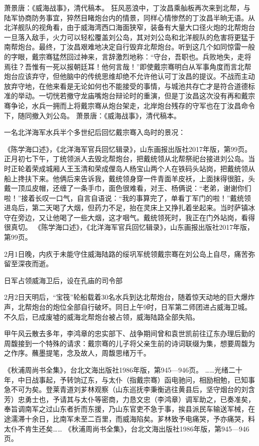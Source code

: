 \documentclass[12pt,UTF8]{ctexbook}
\begin{document}
萧景唐：《威海战事》，清代稿本。
狂风恶浪中，丁汝昌乘舢板再次来到北帮，与陆军协商防务事宜，猝然目睹炮台内的情景，同样心情惨然的丁汝昌半晌无语。从北洋舰队的视角看，由于威海湾西口海面狭窄，装备有大量大口径火炮的北帮炮台一旦落入敌手，火力可以轻松覆盖刘公岛，其对刘公岛和北洋舰队的危害将更猛于南帮炮台。最终，丁汝昌艰难地决定自行毁弃北帮炮台。听到这几个如同惊雷一般的字眼，戴宗骞猛然回过神来，言辞激烈地称：“守台，吾职也。兵败地失，走将焉往？吾惟有一死以报朝廷耳！他何言哉！”即使戴宗骞明白从军事角度而言北帮炮台应该弃守，但他脑中的传统思维却绝不允许他认可丁汝昌的提议。不战而主动放弃守地，在他来看是无论如何也不能接受的事情，与城池共存亡才是符合道德标准的举动。一切恍若撤守龙庙嘴炮台辩论时的重演，但是丁汝昌这次没有再和戴宗骞争论，水兵一拥而上将戴宗骞从炮台架走，北岸炮台残存的守军也在丁汝昌命令下，随同撤入刘公岛。 萧景唐：《威海战事》，清代稿本。

一名北洋海军水兵半个多世纪后回忆戴宗骞入岛时的景况：

《陈学海口述》，《北洋海军官兵回忆辑录》，山东画报出版社2017年版，第99页。
正月初七下午，丁统领派人去毁北帮炮台，把戴统领从北帮祭祀台接进刘公岛。当时正轮着荣成城厢人王玉清和荣成俚岛人杨宝山两个人在铁码头站岗，把戴统领从船上搀扶下来。他俩后来告诉我，戴统领身穿一件青面羊皮袄，上面抹得很脏，头戴一顶瓜皮帽，还缠了一条手巾，面色很难看，对王、杨俩说：“老弟，谢谢你们啦！”接着长叹一口气，自言自语说：“我的事算完了，单看丁军门的啦！”戴统领进岛后，第二天喝了大烟，但药力不足，抬在灵床上又挣扎着坐起来。当时萨镇冰守在旁边，又让他喝了一些大烟，这才咽气。戴统领死时，我正在门外站岗，看得很真切。 《陈学海口述》，《北洋海军官兵回忆辑录》，山东画报出版社2017年版，第99页。

2月1日晚，内疚于未能守住威海陆路的绥巩军统领戴宗骞在刘公岛上自尽，痛苦弥留至深夜而逝。


日军占领威海卫后，设在孔庙的司令部

2月2日天明后，“宝筏”轮船载着30名水兵到达北帮炮台，随着惊天动地的巨大爆炸声，北帮炮台的炮位全部自行破坏。同日上午9时，日军第二师团进占威海卫城。不久后，已成废墟的威海北帮炮台被占领，威海陆路全部失陷。

甲午风云散去多年，李鸿章的忠实部下、战争期间曾和袁世凯前往辽东办理后勤的周馥接到一个特殊的请求：戴宗骞的儿子将父亲生前的诗词联缀为集，想要周馥为之作序。蘸墨提笔，念及故人，周馥思绪万千。

《秋浦周尚书全集》，台北文海出版社1986年版，第945—946页。
……光绪二十年，中日战事起，予转饷辽东，与太仆（指戴宗骞）函电驰问，相励相勉，已知事急不可为矣。登莱青道刘芗林观察（山东巡抚李秉衡逃往黄县后，坚守烟台的刘含芳）忠勇士也，予请其与太仆等密商，力恳文忠（李鸿章）调军助之，已奏准矣，奉旨调南军之过山东者折而东援，乃山东官吏不急于事，挨县派民车输送军械，在途濡滞十余日，比南军未至二百里，而威海陷矣。芗林致予电痛哭，予亦痛哭，料太仆不肯生还矣…… 《秋浦周尚书全集》，台北文海出版社1986年版，第945—946页。
\end{document}
